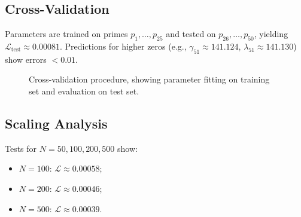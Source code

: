 \subsection*{Cross-Validation}
Parameters are trained on primes \( p_1, \dots, p_{25} \) and tested on \( p_{26}, \dots, p_{50} \), yielding \( \mathcal{L}_{\text{test}} \approx 0.00081 \). Predictions for higher zeros (e.g., \( \gamma_{51} \approx 141.124 \), \( \lambda_{51} \approx 141.130 \)) show errors \( < 0.01 \).

\begin{figure}[t]
\centering
{}
\caption{Cross-validation procedure, showing parameter fitting on training set and evaluation on test set.}
\label{fig:cross_validation}
\end{figure}

\subsection*{Scaling Analysis}
Tests for \( N = 50, 100, 200, 500 \) show:
\begin{itemize}
\setlength{\itemsep}{0pt}
\item \( N = 100 \): \( \mathcal{L} \approx 0.00058 \);
\item \( N = 200 \): \( \mathcal{L} \approx 0.00046 \);
\item \( N = 500 \): \( \mathcal{L} \approx 0.00039 \).
\end{itemize}

